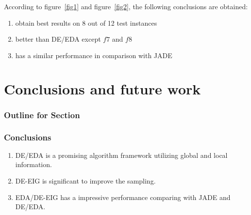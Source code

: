 \documentclass[xcolor=dvipsnames]{beamer}
\begin{document}
    \begin{frame}
    According to figure~\ref{fig1} and figure~\ref{fig2}, the following conclusions are obtained:
    \begin{enumerate}
    \item obtain best results on 8 out of 12 test instances
    \item better than DE/EDA except $f7$ and $f8$
    \item has a similar performance in comparison with JADE
    \end{enumerate}

    \end{frame}

    \section{Conclusions and future work}
    \begin{frame}
      \frametitle{Outline for Section \thesection}
      \tableofcontents[currentsection]
    \end{frame}

    \begin{frame}
    \frametitle{Conclusions}
    \begin{enumerate}
    \item DE/EDA is a promising algorithm framework utilizing global and local information.
    \item DE-EIG is significant to improve the sampling.
    \item EDA/DE-EIG has a impressive performance comparing with JADE and DE/EDA.
    \end{enumerate}
%
    \end{frame}
\end{document}
